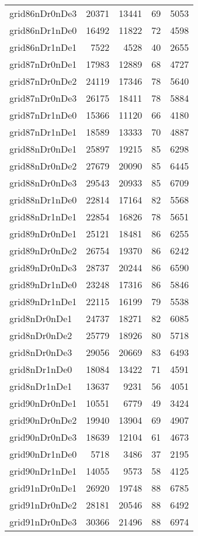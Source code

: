 \begin{tabular}{lrrrr}
grid86nDr0nDe3 & 20371 & 13441 & 69 & 5053 \\
grid86nDr1nDe0 & 16492 & 11822 & 72 & 4598 \\
grid86nDr1nDe1 & 7522 & 4528 & 40 & 2655 \\
grid87nDr0nDe1 & 17983 & 12889 & 68 & 4727 \\
grid87nDr0nDe2 & 24119 & 17346 & 78 & 5640 \\
grid87nDr0nDe3 & 26175 & 18411 & 78 & 5884 \\
grid87nDr1nDe0 & 15366 & 11120 & 66 & 4180 \\
grid87nDr1nDe1 & 18589 & 13333 & 70 & 4887 \\
grid88nDr0nDe1 & 25897 & 19215 & 85 & 6298 \\
grid88nDr0nDe2 & 27679 & 20090 & 85 & 6445 \\
grid88nDr0nDe3 & 29543 & 20933 & 85 & 6709 \\
grid88nDr1nDe0 & 22814 & 17164 & 82 & 5568 \\
grid88nDr1nDe1 & 22854 & 16826 & 78 & 5651 \\
grid89nDr0nDe1 & 25121 & 18481 & 86 & 6255 \\
grid89nDr0nDe2 & 26754 & 19370 & 86 & 6242 \\
grid89nDr0nDe3 & 28737 & 20244 & 86 & 6590 \\
grid89nDr1nDe0 & 23248 & 17316 & 86 & 5846 \\
grid89nDr1nDe1 & 22115 & 16199 & 79 & 5538 \\
grid8nDr0nDe1 & 24737 & 18271 & 82 & 6085 \\
grid8nDr0nDe2 & 25779 & 18926 & 80 & 5718 \\
grid8nDr0nDe3 & 29056 & 20669 & 83 & 6493 \\
grid8nDr1nDe0 & 18084 & 13422 & 71 & 4591 \\
grid8nDr1nDe1 & 13637 & 9231 & 56 & 4051 \\
grid90nDr0nDe1 & 10551 & 6779 & 49 & 3424 \\
grid90nDr0nDe2 & 19940 & 13904 & 69 & 4907 \\
grid90nDr0nDe3 & 18639 & 12104 & 61 & 4673 \\
grid90nDr1nDe0 & 5718 & 3486 & 37 & 2195 \\
grid90nDr1nDe1 & 14055 & 9573 & 58 & 4125 \\
grid91nDr0nDe1 & 26920 & 19748 & 88 & 6785 \\
grid91nDr0nDe2 & 28181 & 20546 & 88 & 6492 \\
grid91nDr0nDe3 & 30366 & 21496 & 88 & 6974 \\

\end{tabular}
